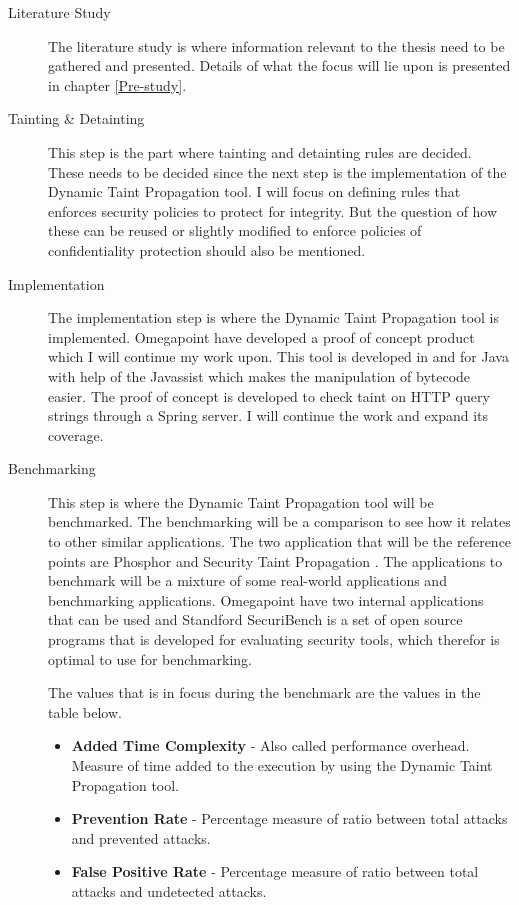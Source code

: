 \documentclass{../kththesis}
\begin{document}
\begin{description}  
	\item [Literature Study]
	The literature study is where information relevant to the thesis need to be gathered and presented. Details of what the focus will lie upon is presented in chapter \ref{Pre-study}.

	\item [Tainting \& Detainting]
	This step is the part where tainting and detainting rules are decided. These needs to be decided since the next step is the implementation of the Dynamic Taint Propagation tool. I will focus on defining rules that enforces security policies to protect for integrity. But the question of how these can be reused or slightly modified to enforce policies of confidentiality protection should also be mentioned.

	\item [Implementation]
	The implementation step is where the Dynamic Taint Propagation tool is implemented. Omegapoint have developed a proof of concept product which I will continue my work upon. This tool is developed in and for Java with help of the Javassist \parencite{Javassist} which makes the manipulation of bytecode easier. The proof of concept is developed to check taint on HTTP query strings through a Spring server. I will continue the work and expand its coverage.

	\item [Benchmarking]
	This step is where the Dynamic Taint Propagation tool will be benchmarked. The benchmarking will be a comparison to see how it relates to other similar applications. The two application that will be the reference points are Phosphor \parencite{phosphor} and Security Taint Propagation \parencite{securityTaint}. The applications to benchmark will be a mixture of some real-world applications and benchmarking applications. Omegapoint have two internal applications that can be used and Standford SecuriBench \parencite{securiBench} is a set of open source programs that is developed for evaluating security tools, which therefor is optimal to use for benchmarking.
	
	The values that is in focus during the benchmark are the values in the table below. 
	
	\begin{itemize}  
		\item \textbf{Added Time Complexity} - Also called performance overhead. Measure of time added to the execution by using the Dynamic Taint Propagation tool.
		\item \textbf{Prevention Rate} - Percentage measure of ratio between total attacks and prevented attacks.
		\item \textbf{False Positive Rate} - Percentage measure of ratio between total attacks and undetected attacks.
	\end{itemize}


\end{description}
\end{document}
